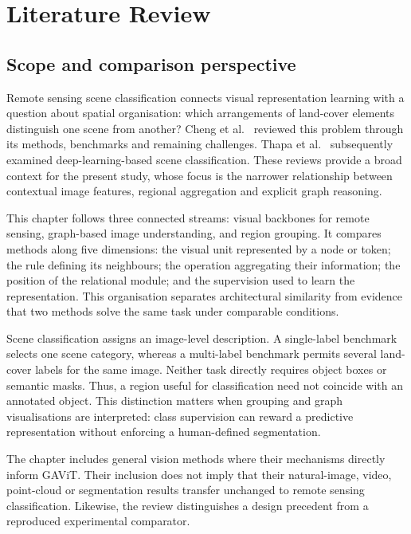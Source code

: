 \chapter{Literature Review}
\label{chap:related-work}

\section{Scope and comparison perspective}

Remote sensing scene classification connects visual representation learning
with a question about spatial organisation: which arrangements of land-cover
elements distinguish one scene from another? Cheng et al.~\cite{cheng2020scene}
reviewed this problem through its methods, benchmarks and remaining challenges.
Thapa et al.~\cite{thapa2023review} subsequently examined deep-learning-based
scene classification. These reviews provide a broad context for the present
study, whose focus is the narrower relationship between contextual image
features, regional aggregation and explicit graph reasoning.

This chapter follows three connected streams: visual backbones for remote
sensing, graph-based image understanding, and region grouping. It compares
methods along five dimensions: the visual unit represented by a node or token;
the rule defining its neighbours; the operation aggregating their information;
the position of the relational module; and the supervision used to learn the
representation. This organisation separates architectural similarity from
evidence that two methods solve the same task under comparable conditions.

Scene classification assigns an image-level description. A single-label
benchmark selects one scene category, whereas a multi-label benchmark permits
several land-cover labels for the same image. Neither task directly requires
object boxes or semantic masks. Thus, a region useful for classification need
not coincide with an annotated object. This distinction matters when grouping
and graph visualisations are interpreted: class supervision can reward a
predictive representation without enforcing a human-defined segmentation.

The chapter includes general vision methods where their mechanisms directly
inform GAViT. Their inclusion does not imply that their natural-image,
video, point-cloud or segmentation results transfer unchanged to remote
sensing classification. Likewise, the review distinguishes a design precedent
from a reproduced experimental comparator.


